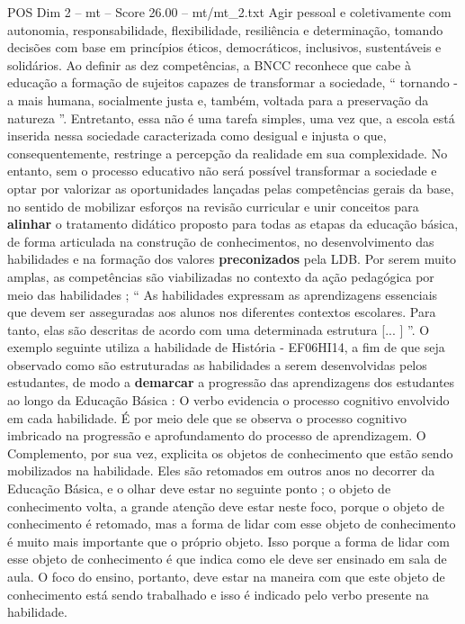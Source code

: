 \begin{textsample}{POS Dim 2 – mt – Score 26.00 – mt/mt\_2.txt}
Agir pessoal e coletivamente com autonomia, responsabilidade, flexibilidade, resiliência e determinação, tomando decisões com base em princípios éticos, democráticos, inclusivos, sustentáveis e solidários.
Ao definir as dez competências, a BNCC reconhece que cabe à educação a formação de sujeitos capazes de transformar a sociedade, “ tornando -a mais humana, socialmente justa e, também, voltada para a preservação da natureza ”.
Entretanto, essa não é uma tarefa simples, uma vez que, a escola está inserida nessa sociedade caracterizada como desigual e injusta o que, consequentemente, restringe a percepção da realidade em sua complexidade.
No entanto, sem o processo educativo não será possível transformar a sociedade e optar por valorizar as oportunidades lançadas pelas competências gerais da base, no sentido de mobilizar esforços na revisão curricular e unir conceitos para \textbf{alinhar} o tratamento didático proposto para todas as etapas da educação básica, de forma articulada na construção de conhecimentos, no desenvolvimento das habilidades e na formação dos valores \textbf{preconizados} pela LDB.
Por serem muito amplas, as competências são viabilizadas no contexto da ação pedagógica por meio das habilidades ; “ As habilidades expressam as aprendizagens essenciais que devem ser asseguradas aos alunos nos diferentes contextos escolares.
Para tanto, elas são descritas de acordo com uma determinada estrutura [... ] ”.
O exemplo seguinte utiliza a habilidade de História - EF06HI14, a fim de que seja observado como são estruturadas as habilidades a serem desenvolvidas pelos estudantes, de modo a \textbf{demarcar} a progressão das aprendizagens dos estudantes ao longo da Educação Básica : O verbo evidencia o processo cognitivo envolvido em cada habilidade.
É por meio dele que se observa o processo cognitivo imbricado na progressão e aprofundamento do processo de aprendizagem.
O Complemento, por sua vez, explicita os objetos de conhecimento que estão sendo mobilizados na habilidade.
Eles são retomados em outros anos no decorrer da Educação Básica, e o olhar deve estar no seguinte ponto ; o objeto de conhecimento volta, a grande atenção deve estar neste foco, porque o objeto de conhecimento é retomado, mas a forma de lidar com esse objeto de conhecimento é muito mais importante que o próprio objeto.
Isso porque a forma de lidar com esse objeto de conhecimento é que indica como ele deve ser ensinado em sala de aula.
O foco do ensino, portanto, deve estar na maneira com que este objeto de conhecimento está sendo trabalhado e isso é indicado pelo verbo presente na habilidade.

\end{textsample}
